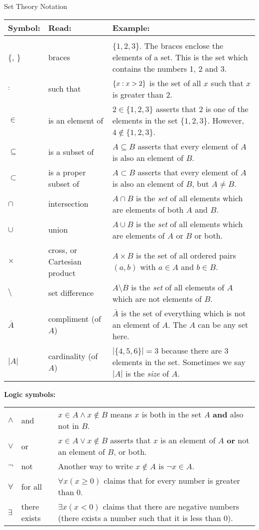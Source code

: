 \documentclass[12pt]{article}
\begin{document}
\begin{defbox}{Set Theory Notation}

\noindent  \begin{tabular}{p{.75in} p{1.5in} p{3.5in}}
    Symbol: & Read: & Example: \\ \hline \\[1ex]
    $\{$, $\}$ & braces & $\{1,2,3\}$.  The braces enclose the elements of a set.  This is the set which contains the numbers 1, 2 and 3.\\[1ex]
    $:$ & such that & $\{x : x > 2\}$ is the set of all $x$ such that $x$ is greater than 2.\\[1ex]
    $\in$ & is an element of & $2 \in \{1,2,3\}$ asserts that 2 is one of the elements in the set $\{1,2,3\}$.  However, $4 \notin\{1,2,3\}$.\\[1ex]
    $\subseteq$ & is a subset of & $A \subseteq B$ asserts that every element of $A$ is also an element of $B$.\\[1ex]
    $\subset$ & is a proper subset of & $A \subset B$ asserts that every element of $A$ is also an element of $B$, but $A \ne B$.\\[1ex]
    $\cap$ & intersection & $A \cap B$ is the {\em set} of all elements which are elements of both $A$ and $B$.\\[1ex]
    $\cup$ & union & $A \cup B$ is the {\em set} of all elements which are elements of $A$ or $B$ or both.\\[1ex]
    $\times$ & cross, or Cartesian product & $A \times B$ is the set of all ordered pairs $(a,b)$ with $a \in A$ and $b \in B$. \\[1ex]
    $\setminus$ & set difference & $A \setminus B$ is the {\em set} of all elements of $A$ which are not elements of $B$.\\[1ex]
    $\bar A$ & compliment (of $A$) & $\bar A$ is the set of everything which is not an element of $A$.  The $A$ can be any set here.\\[1ex]
    $|A|$ & cardinality (of $A$)& $|\{4,5,6\}| = 3$ because there are 3 elements in the set.  Sometimes we say $|A|$ is the {\em size} of $A$.\\[1ex]
\end{tabular}
\noindent\textbf{Logic symbols:}

\noindent  \begin{tabular}{p{.75in} p{1.5in} p{3.5in}}

    $\wedge$ & and & $x \in A \wedge x \notin B$ means $x$ is both in the set $A$ \textbf{and} also not in $B$. \\[1ex]
    $\vee$ & or & $x \in A \vee x \notin B$ asserts that $x$ is an element of $A$ \textbf{or} not an element of $B$, or both. \\[1ex]
    $\neg$ & not & Another way to write $x \notin A$ is $\neg x \in A$.\\[1ex]
    $\forall$ & for all & $\forall x (x \ge 0)$ claims that for every number is greater than 0. \\[1ex]
    $\exists$ & there exists & $\exists x (x < 0)$ claims that there are negative numbers (there exists a number such that it is less than 0). \\[1ex]
  \end{tabular}


\end{defbox}
\end{document}
